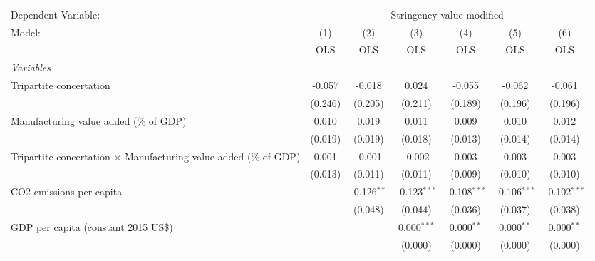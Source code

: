 
\begingroup
\centering
\begin{tabular}{lcccccc}
   \toprule
   Dependent Variable: & \multicolumn{6}{c}{Stringency value modified}\\
   Model:                                                                   & (1)     & (2)           & (3)            & (4)            & (5)            & (6)\\  
                                                                            &  OLS    & OLS           & OLS            & OLS            & OLS            & OLS\\  
   \midrule
   \emph{Variables}\\
   Tripartite concertation                                                  & -0.057  & -0.018        & 0.024          & -0.055         & -0.062         & -0.061\\   
                                                                            & (0.246) & (0.205)       & (0.211)        & (0.189)        & (0.196)        & (0.196)\\   
   Manufacturing value added (\% of GDP)                                    & 0.010   & 0.019         & 0.011          & 0.009          & 0.010          & 0.012\\   
                                                                            & (0.019) & (0.019)       & (0.018)        & (0.013)        & (0.014)        & (0.014)\\   
   Tripartite concertation $\times$ Manufacturing value added (\% of GDP)   & 0.001   & -0.001        & -0.002         & 0.003          & 0.003          & 0.003\\   
                                                                            & (0.013) & (0.011)       & (0.011)        & (0.009)        & (0.010)        & (0.010)\\   
   CO2 emissions per capita                                                 &         & -0.126$^{**}$ & -0.123$^{***}$ & -0.108$^{***}$ & -0.106$^{***}$ & -0.102$^{***}$\\   
                                                                            &         & (0.048)       & (0.044)        & (0.036)        & (0.037)        & (0.038)\\   
   GDP per capita (constant 2015 US\$)                                      &         &               & 0.000$^{***}$  & 0.000$^{**}$   & 0.000$^{**}$   & 0.000$^{**}$\\   
                                                                            &         &               & (0.000)        & (0.000)        & (0.000)        & (0.000)\\   

\end{tabular}
